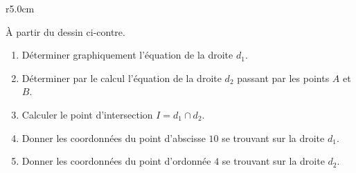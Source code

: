 
\begin{exercice}\label{exosmath-0695}

\begin{wrapfigure}{r}{5.0cm}
   \vspace{-1cm}        %
   \centering
   
\end{wrapfigure}

    À partir du dessin ci-contre.
    \begin{enumerate}
        \item
            Déterminer graphiquement l'équation de la droite \( d_1\).
        \item
            Déterminer par le calcul l'équation de la droite \( d_2\) passant par les points \( A\) et \( B\).
        \item
            Calculer le point d'intersection \( I=d_1\cap d_2\).
        \item
            Donner les coordonnées du point d'abscisse \( 10\) se trouvant sur la droite \( d_1\).
        \item
            Donner les coordonnées du point d'ordonnée \( 4\) se trouvant sur la droite \( d_2\).
    \end{enumerate}

\end{exercice}
